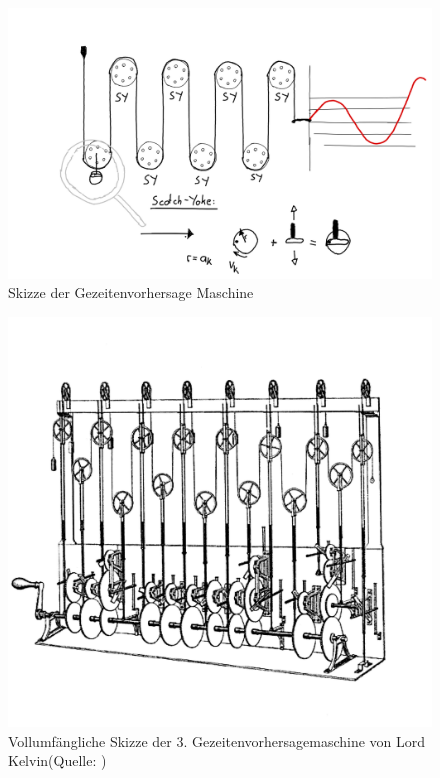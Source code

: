 \begin{figure}
	\centering
	\includegraphics[width=\textwidth]{"papers/gezeiten/Skizze Maschine"}
	\caption{Skizze der Gezeitenvorhersage Maschine}
	\label{fig:skizze-maschine}
\end{figure}

\begin{figure}
	\centering
	\includegraphics[width=\textwidth]{"papers/gezeiten/Thompson Skizze"}
	\caption{Vollumfängliche Skizze der 3. Gezeitenvorhersagemaschine von
		Lord Kelvin(Quelle: \cite{gezeiten:Thompson})
	\label{fig:thompson-skizze}}
\end{figure}


